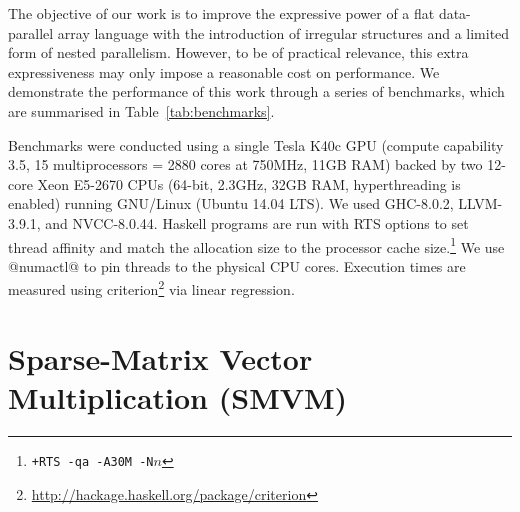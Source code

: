 The objective of our work is to improve the expressive power of a flat
data-parallel array language with the introduction of irregular structures and a
limited form of nested parallelism. However, to be of practical relevance, this extra
expressiveness may only impose a reasonable cost on performance. We demonstrate the
performance of this work through a series of benchmarks, which are summarised in
Table~\ref{tab:benchmarks}.

Benchmarks were conducted using a single Tesla K40c GPU (compute capability 3.5,
15 multiprocessors = 2880 cores at 750MHz, 11GB RAM) backed by two 12-core Xeon
E5-2670 CPUs (64-bit, 2.3GHz, 32GB RAM, hyperthreading is enabled) running
GNU/Linux (Ubuntu 14.04 LTS). We used GHC-8.0.2, LLVM-3.9.1, and NVCC-8.0.44.
Haskell programs are run with RTS options to set thread affinity and match the
allocation size to the processor cache size.\footnote{\texttt{+RTS -qa -A30M
-N$n$}} We use @numactl@ to pin threads to the physical CPU cores.
Execution times are measured using
criterion\footnote{\url{http://hackage.haskell.org/package/criterion}} via
linear regression.%


\section{Sparse-Matrix Vector Multiplication (SMVM)}

